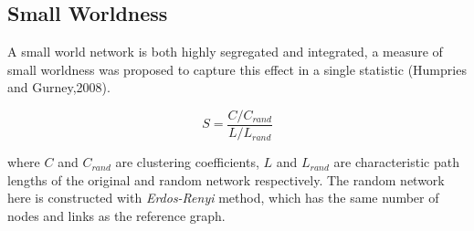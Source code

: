 \documentclass[12pt]{article}
\begin{document}
%
%
%
%
%
%
%
%
% 
%
%
%
\subsection{Small Worldness}

A small world network is both highly segregated and integrated, a measure of small worldness was proposed to capture this effect in a single statistic (Humpries and Gurney,2008).

\begin{equation}
S = \frac{C/C_{rand}}{L/L_{rand}}
\end{equation}
 
 where $C$ and $C_{rand}$ are clustering coefficients, $L$ and $L_{rand}$ are characteristic path lengths of the original and random network respectively. The random network here is constructed with \textit{Erdos-Renyi} method, which has the same number of nodes and links as the reference graph. 
\end{document}
